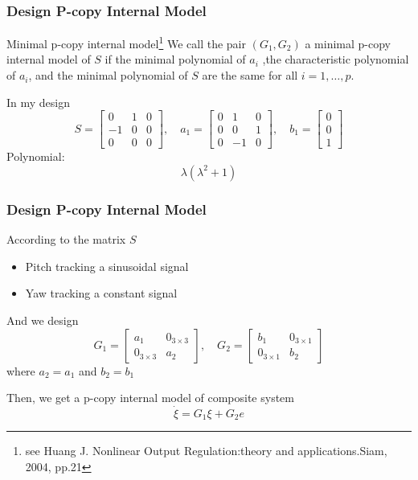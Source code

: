 \documentclass{beamer}
\begin{document}
\begin{frame}[fragile]
	\frametitle{{\color{red} Design P-copy Internal Model}}
\begin{block}{Minimal p-copy internal model\footnote{see Huang J. Nonlinear Output Regulation:theory and applications.Siam, 2004, pp.21}}
  We call the pair $(G_{1},G_{2})$ a minimal p-copy internal model of $S$ if the minimal polynomial of $a_{i}$ ,the characteristic polynomial of $a_{i}$, and the minimal polynomial of $S$ are the same for all $i=1,\dots,p$.
\end{block}
In my design
\begin{equation}\label{matrixS}\nonumber
  S = \left[\begin{matrix}
    0 & 1 & 0 \\
    -1 & 0 & 0 \\
    0 & 0 & 0
  \end{matrix}\right],\quad
  a_{1} = \left[\begin{matrix}
                  0 & 1 & 0 \\
                  0 & 0 & 1 \\
                  0 & -1 & 0
                \end{matrix}\right],\quad
  b_{1} = \left[\begin{matrix}
                  0 \\
                  0 \\
                  1
                \end{matrix}\right]
\end{equation}
Polynomial: $$\lambda(\lambda^{2}+1)$$
\end{frame}


\begin{frame}[fragile]
	\frametitle{{\color{red} Design P-copy Internal Model}}
According to the matrix $S$
	\begin{itemize}
	  \item Pitch tracking a sinusoidal signal
	  \item Yaw tracking a constant signal
	\end{itemize}
And we design
\begin{equation}\label{g1g2}
    G_{1} = \left[\begin{matrix}
                    a_{1} & 0_{3\times 3} \\
                    0_{3\times 3} & a_{2}
                  \end{matrix}\right],\quad
    G_{2} = \left[\begin{matrix}
                b_{1} & 0_{3\times 1} \\
                0_{3\times 1} & b_{2}
              \end{matrix}\right]
\end{equation}
where $a_{2}=a_{1}$ and $b_{2}=b_{1}$

Then, we get a p-copy internal model of composite system
\begin{equation}\label{internal-model}
  \dot{\xi} = G_{1}\xi + G_{2}e
\end{equation}
\end{frame}
\end{document}
